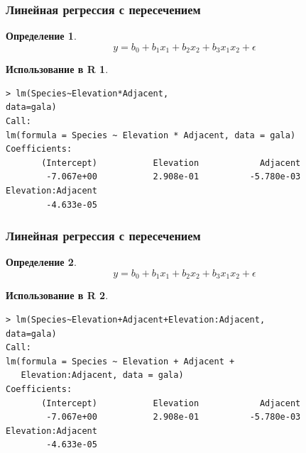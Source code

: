 \documentclass{beamer}
\newtheorem{defn}{Определение}
\newtheorem{exmpr}{Использование в R}
\begin{document}
\begin{frame}[containsverbatim]
\frametitle{Линейная регрессия с пересечением}
\begin{defn}
$$y = b_0+b_1x_1+b_2x_2+b_3x_1x_2+\epsilon$$
\end{defn}
\begin{exmpr}
\begin{verbatim}
> lm(Species~Elevation*Adjacent,
data=gala)
Call:
lm(formula = Species ~ Elevation * Adjacent, data = gala)
Coefficients:
       (Intercept)           Elevation            Adjacent  
        -7.067e+00           2.908e-01          -5.780e-03  
Elevation:Adjacent  
        -4.633e-05  
\end{verbatim}
\end{exmpr}

\end{frame}


\begin{frame}[containsverbatim]
\frametitle{Линейная регрессия с пересечением}
\begin{defn}
$$y = b_0+b_1x_1+b_2x_2+b_3x_1x_2+\epsilon$$
\end{defn}
\begin{exmpr}
\begin{verbatim}
> lm(Species~Elevation+Adjacent+Elevation:Adjacent,
data=gala)
Call:
lm(formula = Species ~ Elevation + Adjacent + 
   Elevation:Adjacent, data = gala)
Coefficients:
       (Intercept)           Elevation            Adjacent  
        -7.067e+00           2.908e-01          -5.780e-03  
Elevation:Adjacent  
        -4.633e-05  
\end{verbatim}
\end{exmpr}

\end{frame}
\end{document}
